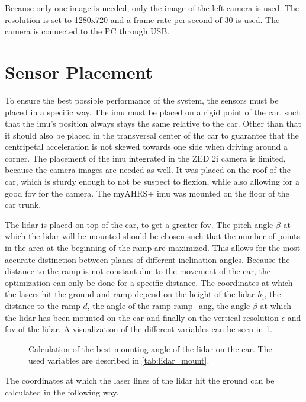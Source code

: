 Because only one image is needed, only the image of the left camera is used.
The resolution is set to 1280x720 and a frame rate per second of 30 is used.
The camera is connected to the PC through USB.



\section{Sensor Placement}
To ensure the best possible performance of the system, the sensors must be placed in a specific way.
The \gls{imu} must be placed on a rigid point of the car, such that the \gls{imu}'s position always stays the same relative to the car.
Other than that it should also be placed in the transversal center of the car to guarantee that the centripetal acceleration is not skewed towards one side when driving around a corner.
The placement of the \gls{imu} integrated in the ZED 2i camera is limited, because the camera images are needed as well.
It was placed on the roof of the car, which is sturdy enough to not be suspect to flexion, while also allowing for a good \gls{fov} for the camera.
The myAHRS+ \gls{imu} was mounted on the floor of the car trunk.

The \gls{lidar} is placed on top of the car, to get a greater \gls{fov}.
The pitch angle $\beta$ at which the \gls{lidar} will be mounted should be chosen such that the number of points in the area at the beginning of the ramp are maximized.
This allows for the most accurate distinction between planes of different inclination angles.
Because the distance to the ramp is not constant due to the movement of the car, the optimization can only be done for a specific distance.
The coordinates at which the lasers hit the ground and ramp depend on the height of the \gls{lidar} $h_\mathrm{l}$, the distance to the ramp $d$, the angle of the ramp \gls{ramp_ang}, the angle $\beta$ at which the \gls{lidar} has been mounted on the car and finally on the vertical resolution $\epsilon$ and \gls{fov} of the \gls{lidar}.
A visualization of the different variables can be seen in \cref{fig:tikz_lidar_mount}.
\begin{figure}[htb]
    \centering
    
    \caption[ placement on the car]{Calculation of the best mounting angle of the \acrshort{lidar} on the car. The used variables are described in \cref{tab:lidar_mount}.}
    \label{fig:tikz_lidar_mount}
\end{figure}
The coordinates at which the laser lines of the \gls{lidar} hit the ground can be calculated in the following way.

